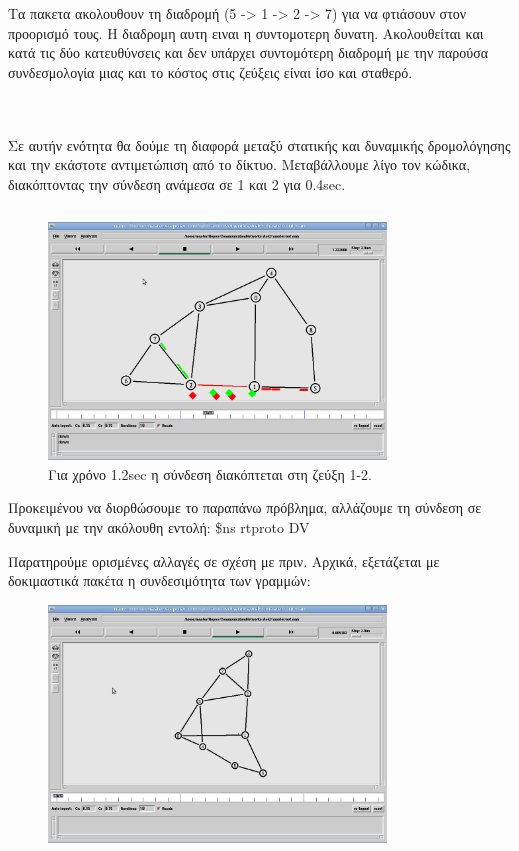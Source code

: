 \documentclass[a4paper,9pt]{article}
\begin{document}
Τα πακετα ακολουθουν τη διαδρομή (5 -> 1 ->  2 -> 7)
για να φτιάσουν στον προορισμό τους. Η διαδρομη αυτη ειναι η συντομοτερη
δυνατη. Ακολουθείται και κατά τις δύο κατευθύνσεις και δεν υπάρχει συντομότερη
διαδρομή με την παρούσα συνδεσμολογία μιας και το κόστος στις ζεύξεις είναι
ίσο και σταθερό.


\inputminted[fontsize=\footnotesize]{tcl}{files/ex3_1.tcl}
\section{}
Σε αυτήν ενότητα θα δούμε τη διαφορά μεταξύ στατικής και δυναμικής
δρομολόγησης και την εκάστοτε αντιμετώπιση από το δίκτυο. Μεταβάλλουμε λίγο
τον κώδικα, διακόπτοντας την σύνδεση ανάμεσα σε 1 και 2 για 0.4sec.

\inputminted[fontsize=\footnotesize]{tcl}{files/ex3_2.tcl}

\begin{figure}[h]
    \centering
    \includegraphics[width=0.8\textwidth]{files/3.png}
    \caption{Για χρόνο 1.2sec η σύνδεση διακόπτεται στη ζεύξη 1-2.}
\end{figure}


Προκειμένου να διορθώσουμε το παραπάνω πρόβλημα, αλλάζουμε τη σύνδεση σε
δυναμική με την ακόλουθη εντολή:
\$ns rtproto DV

Παρατηρούμε ορισμένες αλλαγές σε σχέση με πριν. Αρχικά, εξετάζεται με
δοκιμαστικά πακέτα η συνδεσιμότητα των γραμμών:
\begin{figure}[h]
    \centering
    \includegraphics[width=0.8\textwidth]{files/4.png}
\end{figure}
\end{document}
